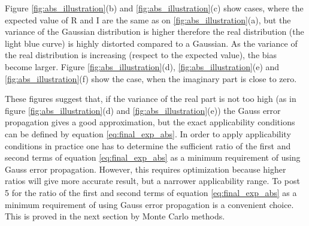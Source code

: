 \documentclass[a4paper,12pt,oneside]{article}
\newcommand{\R}{\mathrm{R}}
\newcommand{\I}{\mathrm{I}}
\begin{document}
Figure \ref{fig:abs_illustration}(b) and \ref{fig:abs_illustration}(c) show cases, where the expected value of $\R$ and $\I$ are the same as on \ref{fig:abs_illustration}(a), but the variance of the Gaussian distribution is higher therefore the real distribution (the light blue curve) is highly distorted compared to a Gaussian. As the variance of the real distribution is increasing (respect to the expected value), the bias become larger. Figure \ref{fig:abs_illustration}(d), \ref{fig:abs_illustration}(e) and \ref{fig:abs_illustration}(f) show the case, when the imaginary part is close to zero.

These figures suggest that, if the variance of the real part is not too high (as in figure \ref{fig:abs_illustration}(d) and \ref{fig:abs_illustration}(e)) the Gauss error propagation gives a good approximation, but the exact applicability conditions can be defined by equation \eqref{eq:final_exp_abs}. In order to apply applicability conditions in practice one has to determine the sufficient ratio of the first and second terms of equation \eqref{eq:final_exp_abs} as a minimum requirement of using Gauss error propagation. However, this requires optimization because higher ratios will give more accurate result, but a narrower applicability range. To post 5 for the ratio of the first and second terms of equation \eqref{eq:final_exp_abs} as a minimum requirement of using Gauss error propagation is a convenient choice. This is proved in the next section by Monte Carlo methods.

\clearpage
\end{document}
